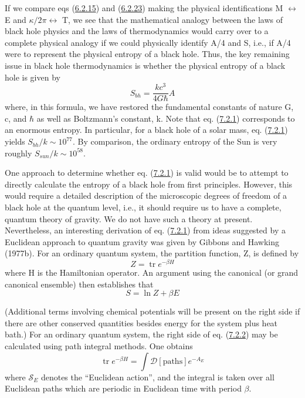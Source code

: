 \documentclass[11pt,a4paper]{article}
\begin{document}
If we compare eqs (\hyperref[eq:6.2.15]{6.2.15}) and (\hyperref[eq:6.2.23]{6.2.23}) making the physical identifications M \(\leftrightarrow\) E and \(\kappa/2\pi \leftrightarrow\) T, we see that the mathematical analogy between the laws of black hole physics and the laws of thermodynamics would carry over to a complete physical analogy if we could physically identify A/4 and S, i.e., if A/4 were to represent the physical entropy of a black hole. Thus, the key remaining issue in black hole thermodynamics is whether the physical entropy of a black hole is given by
\begin{equation*}
S_{bh} = \frac{kc^3}{4G\hbar} A \tag{7.2.1}\label{eq:7.2.1}
\end{equation*} \hypertarget{source-177}{} where, in this formula, we have restored the fundamental constants of nature G, c, and \(\hbar\) as well as Boltzmann's constant, k. Note that eq. (\hyperref[eq:7.2.1]{7.2.1}) corresponds to an enormous entropy. In particular, for a black hole of a solar mass, eq. (\hyperref[eq:7.2.1]{7.2.1}) yields \(S_{bh}/k\sim 10^{77}\). By comparison, the ordinary entropy of the Sun is very roughly \(S_{sun}/k\sim 10^{58}\).

One approach to determine whether eq. (\hyperref[eq:7.2.1]{7.2.1}) is valid would be to attempt to directly calculate the entropy of a black hole from first principles. However, this would require a detailed description of the microscopic degrees of freedom of a black hole at the quantum level, i.e., it should require us to have a complete, quantum theory of gravity. We do not have such a theory at present. Nevertheless, an interesting derivation of eq. (\hyperref[eq:7.2.1]{7.2.1}) from ideas suggested by a Euclidean approach to quantum gravity was given by Gibbons and Hawking (1977b). For an ordinary quantum system, the partition function, Z, is defined by
\begin{equation*}
Z = \operatorname{tr} e^{-\beta H} \tag{7.2.2}\label{eq:7.2.2}
\end{equation*}
where H is the Hamiltonian operator. An argument using the canonical (or grand canonical ensemble) then establishes that
\begin{equation*}
S = \ln Z + \beta E \tag{7.2.3}\label{eq:7.2.3}
\end{equation*}

(Additional terms involving chemical potentials will be present on the right side if there are other conserved quantities besides energy for the system plus heat bath.) For an ordinary quantum system, the right side of eq. (\hyperref[eq:7.2.2]{7.2.2}) may be calculated using path integral methods. One obtains
\begin{equation*}
\operatorname{tr}e^{-\beta H} = \int \mathcal{D}[\text{paths}] e^{-A_E} \tag{7.2.4}\label{eq:7.2.4}
\end{equation*}
where \(\mathcal{S}_E\) denotes the ``Euclidean action'', and the integral is taken over all Euclidean paths which are periodic in Euclidean time with period \(\beta\).
\end{document}
